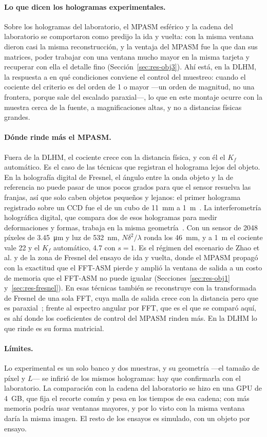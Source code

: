 \paragraph{Lo que dicen los hologramas experimentales.} Sobre los hologramas
del laboratorio, el MPASM esférico y la cadena del laboratorio se comportaron
como predijo la ida y vuelta: con la misma ventana dieron casi la misma
reconstrucción, y la ventaja del MPASM fue la que dan sus matrices, poder
trabajar con una ventana mucho mayor en la misma tarjeta y recuperar con ella
el detalle fino (Sección~\ref{sec:res-obj3}). Ahí está, en la DLHM, la
respuesta a en qué condiciones conviene el control del muestreo: cuando el
cociente del criterio es del orden de 1 o mayor ---un orden de magnitud, no una
frontera, porque sale del escalado paraxial---, lo que en este montaje ocurre
con la muestra
cerca de la fuente, a magnificaciones altas, y no a distancias físicas
grandes.

\paragraph{Dónde rinde más el MPASM.} Fuera de la DLHM, el cociente crece con
la distancia física, y con él el $K_f$ automático. Es el caso de las técnicas
que registran el holograma lejos del objeto. En la holografía digital de
Fresnel, el ángulo entre la onda objeto y la de referencia no puede pasar de
unos pocos grados para que el sensor resuelva las franjas, así que solo caben
objetos pequeños y lejanos: el primer holograma registrado sobre un CCD fue el
de un cubo de \SI{11}{mm} a \SI{1}{m}~\cite{schnars1994}. La interferometría
holográfica digital, que compara dos de esos hologramas para medir
deformaciones y formas, trabaja en la misma geometría~\cite{schnars2005}. Con
un sensor de 2048 píxeles de \SI{3.45}{\micro\metre} y luz de \SI{532}{nm},
$N\delta^2/\lambda$ ronda los \SI{46}{mm}, y a \SI{1}{m} el cociente vale 22 y
el $K_f$ automático, 4.7 con $s = 1$. Es el régimen del escenario de Zhao
et al. y de la zona de Fresnel del ensayo de ida y vuelta, donde el MPASM
propagó con la exactitud que el FFT-ASM pierde y amplió la ventana de salida a
un costo de memoria que el FFT-ASM no puede igualar
(Secciones~\ref{sec:res-obj1} y~\ref{sec:res-fresnel}). En esas técnicas
también se reconstruye con la transformada de Fresnel de una sola FFT, cuya
malla de salida crece con la distancia pero que es paraxial~\cite{schnars2005};
frente al espectro angular por FFT, que es el que se comparó aquí, es ahí donde
los coeficientes de control del MPASM rinden más. En la DLHM lo que rinde es
su forma matricial.

\paragraph{Límites.} Lo experimental es un solo banco y dos muestras, y su
geometría ---el tamaño de píxel y $L$--- se infirió de los mismos hologramas:
hay que confirmarla con el laboratorio. La comparación con la cadena del
laboratorio se hizo en una GPU de \SI{4}{GB}, que fija el recorte común y pesa
en los tiempos de esa cadena; con más memoria podría usar ventanas mayores, y
por lo visto con la misma ventana daría la misma imagen. El resto de los
ensayos es simulado, con un objeto por ensayo.
